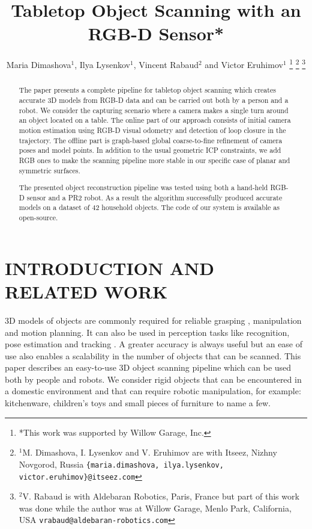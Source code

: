 \documentclass[letterpaper, 10 pt, conference]{ieeeconf}  %
\title{\LARGE \bf
Tabletop Object Scanning with an RGB-D Sensor*
}
\author{Maria Dimashova$^{1}$, Ilya Lysenkov$^{1}$, Vincent Rabaud$^{2}$ and Victor Eruhimov$^{1}$
\thanks{*This work was supported by Willow Garage, Inc.}%
\thanks{$^{1}$M. Dimashova, I. Lysenkov and V. Eruhimov are with Itseez, Nizhny Novgorod, Russia
        {\tt\small \{maria.dimashova, ilya.lysenkov, victor.eruhimov\}@itseez.com}}%
\thanks{$^{2}$V. Rabaud is with Aldebaran Robotics, Paris, France but part of this work was done while the author was 
at Willow Garage, Menlo Park, California, USA {\tt\small vrabaud@aldebaran-robotics.com}}%
}
\begin{document}
\maketitle
\thispagestyle{empty}
\pagestyle{empty}


\begin{abstract}
The paper presents a complete pipeline for tabletop object scanning
which creates accurate 3D models from RGB-D data and can be carried out both by a person
and a robot. We consider the capturing scenario where a camera makes
a single turn around an object located on a table. The online part of our approach consists 
of initial camera motion estimation using RGB-D visual
odometry and detection of loop closure in the trajectory. The offline part
is graph-based global coarse-to-fine refinement of camera poses and model points.
In addition to the usual geometric ICP constraints, we add
RGB ones to make the scanning pipeline more stable in our specific case 
of planar and symmetric surfaces. 

The presented object reconstruction pipeline was tested using both a hand-held RGB-D sensor and a PR2 robot.
As a result the algorithm successfully produced accurate models on a dataset of 42 household objects.
The code of our system is available as open-source.

\end{abstract}


\section{INTRODUCTION AND RELATED WORK}

3D models of objects are commonly required for reliable grasping \cite{miller2004graspit, sahbani2012overview},
manipulation and motion planning. It can also be used in perception tasks like recognition, pose estimation and tracking \cite{klank2009real, hinterstoisser2012accv}.
A greater accuracy is always useful but an ease of use also enables a scalability
in the number of objects that can be scanned.
This paper describes an easy-to-use 3D object scanning pipeline
which can be used both by people and robots.
We consider rigid objects that can be encountered
in a domestic environment and that can require robotic manipulation, for example:
kitchenware, children's toys and small pieces of furniture to name a few.
\end{document}
